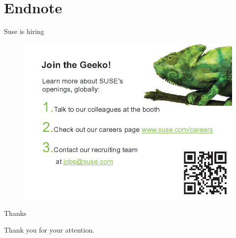 \documentclass{beamer}
\begin{document}
\section{Endnote}

\begin{frame}{Suse is hiring}
	\begin{figure}
	\includegraphics[width= 0.8\linewidth]{suse_hiring.png}
	\end{figure}
\end{frame}

\begin{frame}{Thanks}
	\begin{center}
	Thank you for your attention.
	\end{center}
\end{frame}
\end{document}
